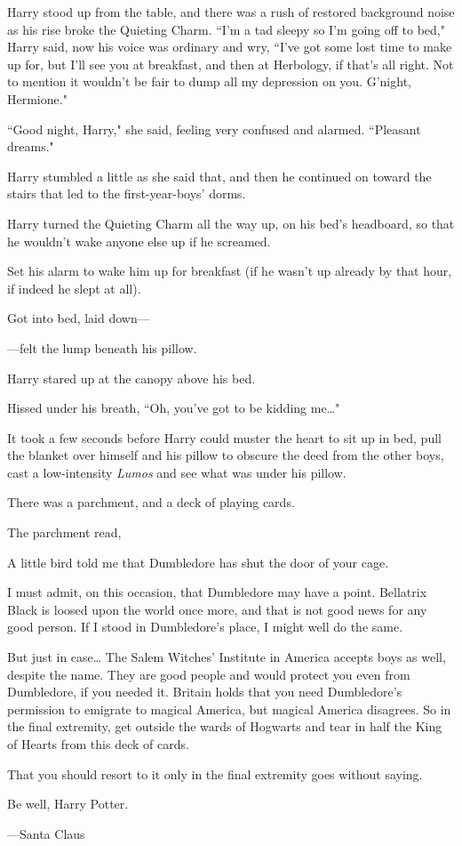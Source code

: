 Harry stood up from the table, and there was a rush of restored background noise as his rise broke the Quieting Charm. ``I'm a tad sleepy so I'm going off to bed," Harry said, now his voice was ordinary and wry, ``I've got some lost time to make up for, but I'll see you at breakfast, and then at Herbology, if that's all right. Not to mention it wouldn't be fair to dump all my depression on you. G'night, Hermione."

``Good night, Harry," she said, feeling very confused and alarmed. ``Pleasant dreams."

Harry stumbled a little as she said that, and then he continued on toward the stairs that led to the first-year-boys' dorms.

\later

Harry turned the Quieting Charm all the way up, on his bed's headboard, so that he wouldn't wake anyone else up if he screamed.

Set his alarm to wake him up for breakfast (if he wasn't up already by that hour, if indeed he slept at all).

Got into bed, laid down—

—felt the lump beneath his pillow.

Harry stared up at the canopy above his bed.

Hissed under his breath, ``Oh, you've got to be kidding me{\ldots}"

It took a few seconds before Harry could muster the heart to sit up in bed, pull the blanket over himself and his pillow to obscure the deed from the other boys, cast a low-intensity \emph{Lumos} and see what was under his pillow.

There was a parchment, and a deck of playing cards.

The parchment read,

\begin{writtenNote}
A little bird told me that Dumbledore has shut the door of your cage.

I must admit, on this occasion, that Dumbledore may have a point. Bellatrix Black is loosed upon the world once more, and that is not good news for any good person. If I stood in Dumbledore's place, I might well do the same.

But just in case{\ldots} The Salem Witches' Institute in America accepts boys as well, despite the name. They are good people and would protect you even from Dumbledore, if you needed it. Britain holds that you need Dumbledore's permission to emigrate to magical America, but magical America disagrees. So in the final extremity, get outside the wards of Hogwarts and tear in half the King of Hearts from this deck of cards.

That you should resort to it only in the final extremity goes without saying.

Be well, Harry Potter.

—Santa Claus
\end{writtenNote}

